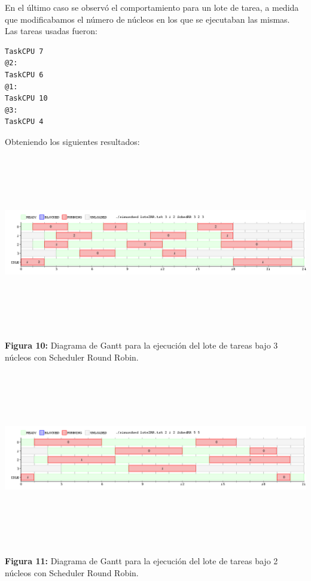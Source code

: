 \documentclass[a4paper]{article}
\begin{document}
 En el último caso se observó el comportamiento para un lote  de tarea, a medida que modificabamos el número de núcleos en los que se ejecutaban las mismas.\\
 
 Las tareas usadas fueron:
 \begin{codesnippet}
	\begin{verbatim}
TaskCPU 7
@2:
TaskCPU 6
@1:
TaskCPU 10
@3:
TaskCPU 4
	\end{verbatim}
	\end{codesnippet}
	\newpage
	
	Obteniendo los siguientes resultados:

  \includegraphics[width=\textwidth,height=3.0in,keepaspectratio]{imagenes/ej4/eje4.png} \\
\begin {flushleft}
\textbf{Figura 10:} Diagrama de Gantt para la ejecuci\'on del lote de tareas bajo 3 n\'ucleos con Scheduler Round Robin.
\end{flushleft}

 \includegraphics[width=\textwidth,height=3.0in,keepaspectratio]{imagenes/ej4/eje6.png} \\
\begin {flushleft}
\textbf{Figura 11:} Diagrama de Gantt para la ejecuci\'on del lote de tareas bajo 2 n\'ucleos con Scheduler Round Robin.
\end{flushleft}
 
\end{document}
